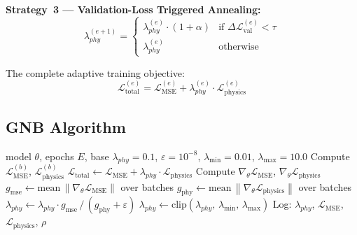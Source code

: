 \documentclass[conference]{IEEEtran}
\newcommand{\norm}[1]{\left\lVert#1\right\rVert}
\begin{document}
\textbf{Strategy~3 — Validation-Loss Triggered Annealing:}
\begin{equation}
  \lambda_{phy}^{(e+1)} = \begin{cases}
    \lambda_{phy}^{(e)}\cdot(1+\alpha) &
      \text{if }\Delta\mathcal{L}_{\text{val}}^{(e)}<\tau \\
    \lambda_{phy}^{(e)} & \text{otherwise}
  \end{cases}
\end{equation}

The complete adaptive training objective:
\begin{equation}
  \mathcal{L}_{\text{total}}^{(e)} =
    \mathcal{L}_{\text{MSE}}^{(e)} +
    \lambda_{phy}^{(e)}\cdot\mathcal{L}_{\text{physics}}^{(e)}
\end{equation}

\subsection{GNB Algorithm}

\begin{algorithm}[H]
\caption{Adaptive Physics Loss Scheduling — GNB Strategy}
\label{alg:gnb}
\begin{algorithmic}[1]
\REQUIRE model $\theta$, epochs $E$, base $\lambda_{phy}=0.1$,
         $\varepsilon=10^{-8}$, $\lambda_{\min}=0.01$,
         $\lambda_{\max}=10.0$
    \STATE Compute $\mathcal{L}_{\text{MSE}}^{(b)}$,
           $\mathcal{L}_{\text{physics}}^{(b)}$
    \STATE $\mathcal{L}_{\text{total}} \leftarrow
           \mathcal{L}_{\text{MSE}} +
           \lambda_{phy}\cdot\mathcal{L}_{\text{physics}}$
    \STATE Compute $\nabla_\theta\mathcal{L}_{\text{MSE}}$,
           $\nabla_\theta\mathcal{L}_{\text{physics}}$
  \ENDFOR
  \STATE $g_{\text{mse}} \leftarrow
         \text{mean}\,\norm{\nabla_\theta\mathcal{L}_{\text{MSE}}}$
         over batches
  \STATE $g_{\text{phy}} \leftarrow
         \text{mean}\,\norm{\nabla_\theta\mathcal{L}_{\text{physics}}}$
         over batches
  \STATE $\lambda_{phy} \leftarrow
         \lambda_{phy}\cdot g_{\text{mse}}\,/\,
         (g_{\text{phy}}+\varepsilon)$
  \STATE $\lambda_{phy} \leftarrow
         \text{clip}(\lambda_{phy},\,\lambda_{\min},\,\lambda_{\max})$
  \STATE Log: $\lambda_{phy}$, $\mathcal{L}_{\text{MSE}}$,
              $\mathcal{L}_{\text{physics}}$, $\rho$
\ENDFOR
\end{algorithmic}
\end{algorithm}
\end{document}
